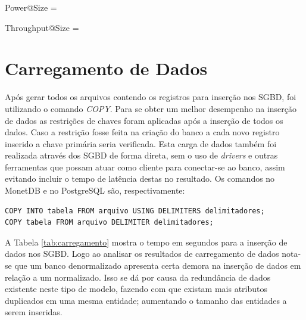 \begin{myequation}%
\label{eq:1-2}
{\scriptstyle Power@Size} =  %
\end{myequation}
%

\begin{myequation}%
\label{eq:2-2}
{\scriptstyle Throughput@Size} =  %
\end{myequation}
%

\section{Carregamento de Dados}

Após gerar todos os arquivos contendo os registros para inserção nos SGBD, foi utilizando o comando \textit{COPY}. Para se obter um melhor desempenho na inserção de dados as restrições de chaves foram aplicadas após a inserção de todos os dados. Caso a restrição fosse feita na criação do banco a cada novo registro inserido a chave primária seria verificada. Esta carga de dados também foi realizada através dos SGBD de forma direta, sem o uso de \textit{drivers} e outras ferramentas que possam atuar como cliente para conectar-se ao banco, assim evitando incluir o tempo de latência destas no resultado. Os comandos no MonetDB e no PostgreSQL são, respectivamente:

\begin{verbatim}
COPY INTO tabela FROM arquivo USING DELIMITERS delimitadores;
COPY tabela FROM arquivo DELIMITER delimitadores;
\end{verbatim}

A Tabela \ref{tab:carregamento} mostra o tempo em segundos para a inserção de dados nos SGBD. Logo ao analisar os resultados de carregamento de dados nota-se que um banco denormalizado apresenta certa demora na inserção de dados em relação a um normalizado. Isso se dá por causa da redundância de dados existente neste tipo de modelo, fazendo com que existam mais atributos duplicados em uma mesma entidade; aumentando o tamanho das entidades a serem inseridas. 

